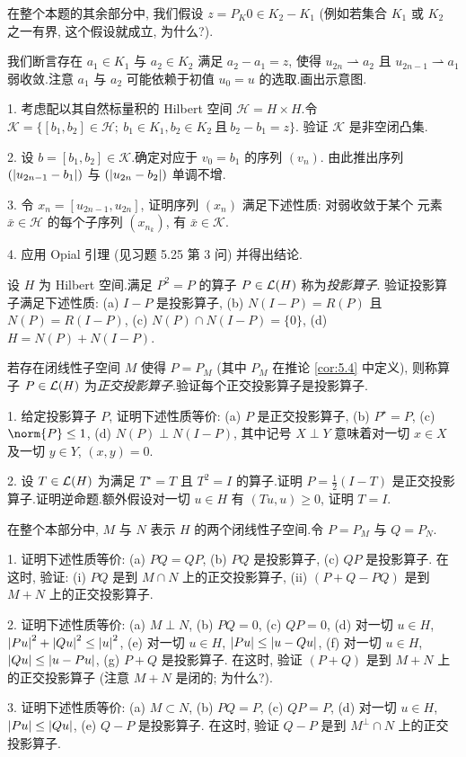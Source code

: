 \begin{problem}
在整个本题的其余部分中, 我们假设 $z=P_K0\in K_2-K_1$ (例如若集合 $K_1$ 或 $K_2$
之一有界, 这个假设就成立, 为什么?).

我们断言存在 $a_1\in K_1$ 与 $a_2\in K_2$ 满足 $a_2-a_1=z$, 使得
$u_{2n}\rightharpoonup a_2$ 且 $u_{2n-1}\rightharpoonup a_1$ 弱收敛.注意 $a_1$
与 $a_2$ 可能依赖于初值 $u_0=u$ 的选取.画出示意图.

1. 考虑配以其自然标量积的 Hilbert 空间 $\mathcal{H}=H\times H$.令
$\mathcal{K}=\{[b_1,b_2]\in\mathcal{H};\ b_1\in K_1,b_2\in K_2\ \text{且}\ b_2-b_1=z\}$.
验证 $\mathcal{K}$ 是非空闭凸集.

2. 设 $b=[b_1,b_2]\in\mathcal{K}$.确定对应于 $v_0=b_1$ 的序列 $(v_n)$.
由此推出序列 $(\left|u_{2n-1}-b_1\right|)$ 与 $(\left|u_{2n}-b_2\right|)$ 单调不增.

3. 令 $x_n=[u_{2n-1},u_{2n}]$, 证明序列 $(x_n)$ 满足下述性质: 对弱收敛于某个
元素 $\bar x\in\mathcal{H}$ 的每个子序列 $(x_{n_k})$, 有 $\bar x\in\mathcal{K}$.

4. 应用 Opial 引理 (见习题 5.25 第 3 问) 并得出结论.
\end{problem}

\begin{problem}
\label{prob:28}
设 $H$ 为 Hilbert 空间.满足 $P^2=P$ 的算子 $P\in\mathcal{L}(H)$ 称为\emph{投影算子}.
验证投影算子满足下述性质:
(a) $I-P$ 是投影算子,
(b) $N(I-P)=R(P)$ 且 $N(P)=R(I-P)$,
(c) $N(P)\cap N(I-P)=\{0\}$,
(d) $H=N(P)+N(I-P)$.


若存在闭线性子空间 $M$ 使得 $P=P_M$ (其中 $P_M$ 在推论  \ref{cor:5.4} 中定义),
则称算子 $P\in\mathcal{L}(H)$ 为\emph{正交投影算子}.验证每个正交投影算子是投影算子.

1. 给定投影算子 $P$, 证明下述性质等价:
(a) $P$ 是正交投影算子,
(b) $P^\star=P$,
(c) $\norm{P}\le1$,
(d) $N(P)\perp N(I-P)$,
其中记号 $X\perp Y$ 意味着对一切 $x\in X$ 及一切 $y\in Y$, $(x,y)=0$.

2. 设 $T\in\mathcal{L}(H)$ 为满足 $T^\star=T$ 且 $T^2=I$ 的算子.证明 $P=\frac12(I-T)$
是正交投影算子.证明逆命题.额外假设对一切 $u\in H$ 有 $(Tu,u)\ge0$, 证明 $T=I$.


在整个本部分中, $M$ 与 $N$ 表示 $H$ 的两个闭线性子空间.令 $P=P_M$ 与 $Q=P_N$.

1. 证明下述性质等价:
(a) $PQ=QP$,
(b) $PQ$ 是投影算子,
(c) $QP$ 是投影算子.
在这时, 验证: (i) $PQ$ 是到 $M\cap N$ 上的正交投影算子, (ii) $(P+Q-PQ)$ 是到
$M+N$ 上的正交投影算子.

2. 证明下述性质等价:
(a) $M\perp N$,
(b) $PQ=0$,
(c) $QP=0$,
(d) 对一切 $u\in H$, $\left|Pu\right|^2+\left|Qu\right|^2\le\left|u\right|^2$,
(e) 对一切 $u\in H$, $\left|Pu\right|\le\left|u-Qu\right|$,
(f) 对一切 $u\in H$, $\left|Qu\right|\le\left|u-Pu\right|$,
(g) $P+Q$ 是投影算子.
在这时, 验证 $(P+Q)$ 是到 $M+N$ 上的正交投影算子 (注意 $M+N$ 是闭的; 为什么?).

3. 证明下述性质等价:
(a) $M\subset N$,
(b) $PQ=P$,
(c) $QP=P$,
(d) 对一切 $u\in H$, $\left|Pu\right|\le\left|Qu\right|$,
(e) $Q-P$ 是投影算子.
在这时, 验证 $Q-P$ 是到 $M^\perp\cap N$ 上的正交投影算子.
\end{problem}


